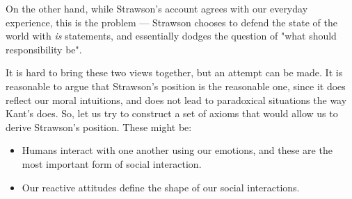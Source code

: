 \documentclass{article}
\begin{document}
On the other hand, while Strawson's account agrees with our everyday experience,
this is the problem --- Strawson chooses to defend the state of the world with
\emph{is} statements, and essentially dodges the question of
"what should responsibility be".

It is hard to bring these two views together, but an attempt can be made. It
is reasonable to argue that Strawson's position is the reasonable one, since
it does reflect our moral intuitions, and does not lead to paradoxical situations
the way Kant's does. So, let us try to construct a set of axioms that would
allow us to derive Strawson's position. These might be:

\begin{itemize}
    \item Humans interact with one another using our emotions, and these are 
        the most important form of social interaction.
    \item Our reactive attitudes define the shape of our social interactions.
\end{itemize}

\nocite{*} \printbibliography
\end{document}
